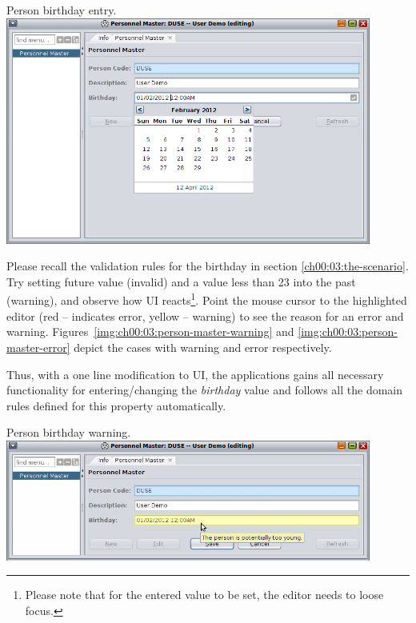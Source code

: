   \begin{image}{Person birthday entry.}{\label{img:ch00:03:person-master-editing}}
    \includegraphics[width=0.9\textwidth]{parts/00-part/chapters/02-making-changes/images/09-person-master-editing.png}
  \end{image}
  
  Please recall the validation rules for the birthday in section \ref{ch00:03:the-scenario}.
  Try setting future value (invalid) and a value less than 23 into the past (warning), and observe how UI reacts\footnote{Please note that for the entered value to be set, the editor needs to loose focus.}.
  Point the mouse cursor to the highlighted editor (red -- indicates error, yellow -- warning) to see the reason for an error and warning.
  Figures~\ref{img:ch00:03:person-master-warning} and \ref{img:ch00:03:person-master-error} depict the cases with warning and error respectively.
  
  Thus, with a one line modification to UI, the applications gains all necessary functionality for entering/changing the \emph{birthday} value and follows all the domain rules defined for this property automatically.
  
  \begin{image}{Person birthday warning.}{\label{img:ch00:03:person-master-warning}}
    \includegraphics[width=0.9\textwidth]{parts/00-part/chapters/02-making-changes/images/10-person-master-warning.png}
  \end{image}

